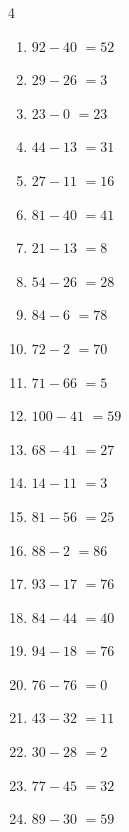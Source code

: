 \begin{multicols}{4}
\begin{enumerate}
  \item $92-40$
        $=52$

  \item $29-26$
        $=3$

  \item $23-0$
        $=23$

  \item $44-13$
        $=31$

  \item $27-11$
        $=16$

  \item $81-40$
        $=41$

  \item $21-13$
        $=8$

  \item $54-26$
        $=28$

  \item $84-6$
        $=78$

  \item $72-2$
        $=70$

  \item $71-66$
        $=5$

  \item $100-41$
        $=59$

  \item $68-41$
        $=27$

  \item $14-11$
        $=3$

  \item $81-56$
        $=25$

  \item $88-2$
        $=86$

  \item $93-17$
        $=76$

  \item $84-44$
        $=40$

  \item $94-18$
        $=76$

  \item $76-76$
        $=0$

  \item $43-32$
        $=11$

  \item $30-28$
        $=2$

  \item $77-45$
        $=32$

  \item $89-30$
        $=59$


\end{enumerate}
\end{multicols}
